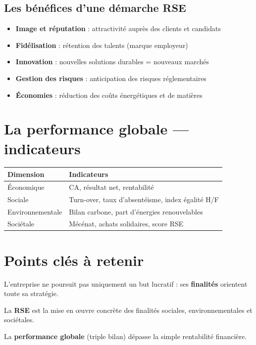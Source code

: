 \documentclass[11pt,a4paper]{article}
\begin{document}
\subsection*{Les bénéfices d'une démarche RSE}
\begin{itemize}
  \item \textbf{Image et réputation} : attractivité auprès des clients et candidats
  \item \textbf{Fidélisation} : rétention des talents (marque employeur)
  \item \textbf{Innovation} : nouvelles solutions durables = nouveaux marchés
  \item \textbf{Gestion des risques} : anticipation des risques réglementaires
  \item \textbf{Économies} : réduction des coûts énergétiques et de matières
\end{itemize}

\section*{La performance globale — indicateurs}

\begin{center}
\begin{tabular}{|l|l|}
\hline
\textbf{Dimension} & \textbf{Indicateurs} \\
\hline
Économique & CA, résultat net, rentabilité \\
Sociale & Turn-over, taux d'absentéisme, index égalité H/F \\
Environnementale & Bilan carbone, part d'énergies renouvelables \\
Sociétale & Mécénat, achats solidaires, score RSE \\
\hline
\end{tabular}
\end{center}

\section*{Points clés à retenir}

\begin{keybox}
L'entreprise ne poursuit pas uniquement un but lucratif : ses \textbf{finalités} orientent toute sa stratégie.
\end{keybox}
\vspace{3pt}
\begin{keybox}
La \textbf{RSE} est la mise en œuvre concrète des finalités sociales, environnementales et sociétales.
\end{keybox}
\vspace{3pt}
\begin{keybox}
La \textbf{performance globale} (triple bilan) dépasse la simple rentabilité financière.
\end{keybox}
\end{document}
